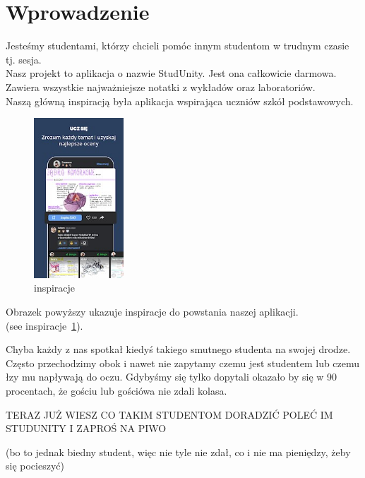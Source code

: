 \section{Wprowadzenie}
\label{sec:Wprowadzenie}
\begin{flushleft}

    Jesteśmy studentami, którzy chcieli pomóc innym studentom w trudnym czasie tj. sesja. \\ 
    Nasz projekt to aplikacja o nazwie StudUnity. Jest ona całkowicie darmowa. Zawiera wszystkie najważniejsze notatki z wykładów oraz laboratoriów. \\ Naszą główną inspiracją była aplikacja wspirająca uczniów szkół podstawowych.
    
\begin{figure}[htbp]
    \centering
    \includegraphics[width=0.3\textwidth]{pictures/inspriracje.jpg}
    \caption{inspiracje}
    \label{fig:inspiracje}
\end{figure}

\noindent Obrazek powyższy ukazuje inspiracje do powstania naszej aplikacji.\\
(see inspiracje~\ref{fig:inspiracje}).
\newpage
\vspace {0.60cm}

    Chyba każdy z nas spotkał kiedyś takiego smutnego studenta na swojej drodze. Często przechodzimy obok i nawet nie zapytamy czemu jest studentem lub czemu łzy mu napływają do oczu. 
    Gdybyśmy się tylko dopytali okazało by się w 90 procentach, że gościu lub gościówa nie zdali kolasa. 
    
\vspace {0.60cm}

    {{\large TERAZ JUŻ WIESZ CO TAKIM STUDENTOM DORADZIĆ   }}
    {{\Large POLEĆ IM STUDUNITY I ZAPROŚ NA PIWO}}
    
\vspace {0.50cm}

    (bo to jednak biedny student, więc nie tyle nie zdał, co i nie ma pieniędzy, żeby się pocieszyć)
    

\end{flushleft}

